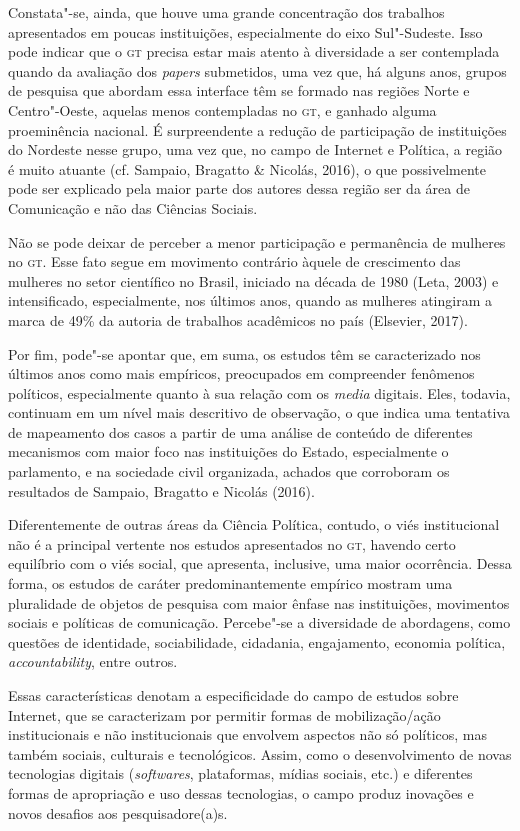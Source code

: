 Constata"-se, ainda, que houve uma grande concentração dos trabalhos
apresentados em poucas instituições, especialmente do eixo Sul"-Sudeste.
Isso pode indicar que o \textsc{gt} precisa estar mais atento à diversidade a ser
contemplada quando da avaliação dos \emph{papers} submetidos, uma vez
que, há alguns anos, grupos de pesquisa que abordam essa interface têm
se formado nas regiões Norte e Centro"-Oeste, aquelas menos contempladas
no \textsc{gt}, e ganhado alguma proeminência nacional. É surpreendente a redução
de participação de instituições do Nordeste nesse grupo, uma vez que, no
campo de Internet e Política, a região é muito atuante (cf. Sampaio,
Bragatto \& Nicolás, 2016), o que possivelmente pode ser explicado pela
maior parte dos autores dessa região ser da área de Comunicação e
não das Ciências Sociais.

Não se pode deixar de perceber a menor participação e permanência de
mulheres no \textsc{gt}. Esse fato segue em movimento contrário àquele de
crescimento das mulheres no setor científico no Brasil, iniciado na
década de 1980 (Leta, 2003) e intensificado, especialmente, nos últimos
anos, quando as mulheres atingiram a marca de 49\% da autoria de
trabalhos acadêmicos no país (Elsevier, 2017).

Por fim, pode"-se apontar que, em suma, os estudos têm se caracterizado
nos últimos anos como mais empíricos, preocupados em compreender
fenômenos políticos, especialmente quanto à sua relação com os
\emph{media} digitais. Eles, todavia, continuam em um nível mais
descritivo de observação, o que indica uma tentativa de mapeamento dos
casos a partir de uma análise de conteúdo de diferentes mecanismos com
maior foco nas instituições do Estado, especialmente o parlamento, e na
sociedade civil organizada, achados que corroboram os resultados de
Sampaio, Bragatto e Nicolás (2016).

Diferentemente de outras áreas da Ciência Política, contudo, o viés
institucional não é a principal vertente nos estudos apresentados no \textsc{gt},
havendo certo equilíbrio com o viés social, que apresenta, inclusive,
uma maior ocorrência. Dessa forma, os estudos de caráter
predominantemente empírico mostram uma pluralidade de objetos de
pesquisa com maior ênfase nas instituições, movimentos sociais e
políticas de comunicação. Percebe"-se a diversidade de abordagens, como
questões de identidade, sociabilidade, cidadania, engajamento, economia
política, \emph{accountability}, entre outros.

Essas características denotam a especificidade do campo de estudos sobre
Internet, que se caracterizam por permitir formas de mobilização/ação
institucionais e não institucionais que envolvem aspectos não só
políticos, mas também sociais, culturais e tecnológicos. Assim, como o
desenvolvimento de novas tecnologias digitais (\emph{softwares},
plataformas, mídias sociais, etc.) e diferentes formas de apropriação e
uso dessas tecnologias, o campo produz inovações e novos desafios aos
pesquisadore(a)s.

